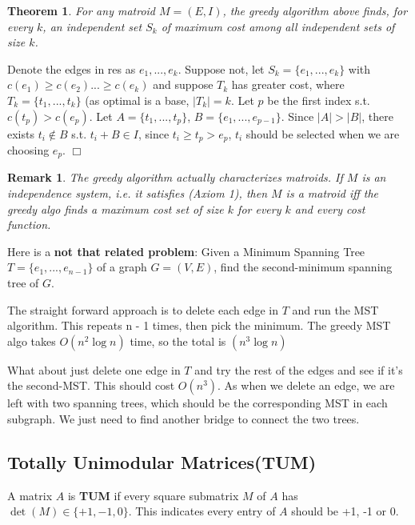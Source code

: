 \documentclass[11pt]{article}
\newtheorem{theorem}[lemma]{Theorem}
\newtheorem{remark}{Remark}
\newenvironment{proof}{\vspace{-0.05in}\noindent{\bf Proof:}}%
        {\hspace*{\fill}$\Box$\par}
\begin{document}
    \begin{theorem}
      For any matroid $M = (E,I)$, the greedy algorithm above finds, for every $k$, an independent set $S_k$ of maximum cost among all independent sets of size $k$.
    \end{theorem}
    \begin{proof}
      Denote the edges in res as $e_1, ..., e_k$. Suppose not, let $S_k = \{e_1, ..., e_k\}$ with $c(e_1) \ge c(e_2) ... \ge c(e_k)$ and suppose $T_k$ has greater cost, where $T_k = \{t_1, ..., t_k\}$ (as optimal is a base, $|T_k| = k$. Let $p$ be the first index s.t. $c(t_p) > c(e_p)$. Let $A = \{t_1, ..., t_p\}$, $B = \{e_1, ..., e_{p - 1}\}$. Since $|A| > |B|$, there exists $t_i \notin B$ s.t. $t_i + B \in I$, since $t_i \ge t_p > e_p$, $t_i$ should be selected when we are choosing $e_p$.
    \end{proof}

    \begin{remark}
      The greedy algorithm actually characterizes matroids. If $M$ is an independence system, i.e. it satisfies (Axiom 1), then $M$ is a matroid iff the greedy algo finds a maximum cost set of size $k$ for every $k$ and every cost function.
    \end{remark}

    Here is a \textbf{not that related problem}: Given a Minimum Spanning Tree $T = \{e_1, ..., e_{n - 1}\}$ of a graph $G = (V, E)$, find the second-minimum spanning tree of $G$.

    The straight forward approach is to delete each edge in $T$ and run the MST algorithm. This repeats n - 1 times, then pick the minimum. The greedy MST algo takes $O(n^2 \log n)$ time, so the total is $(n^3 \log n)$

    What about just delete one edge in $T$ and try the rest of the edges and see if it's the second-MST. This should cost $O(n^3)$. As when we delete an edge, we are left with two spanning trees, which should be the corresponding MST in each subgraph. We just need to find another bridge to connect the two trees.



  \subsection{Totally Unimodular Matrices(TUM)}
    A matrix $A$ is \textbf{TUM} if every square submatrix $M$ of $A$ has $\det(M) \in \{+1, -1, 0\}$. This indicates every entry of $A$ should be +1, -1 or 0. 
\end{document}
